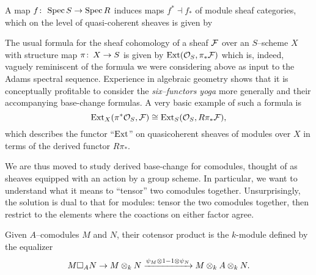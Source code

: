 \begin{definition}
A map $f\colon\thinspace \operatorname{Spec} S \to \operatorname{Spec} R$ induces maps $f^* \dashv f_*$ of module sheaf categories, which on the level of quasi-coherent sheaves is given by
\begin{center}
\end{center}
\end{definition}

The usual formula for the sheaf cohomology of a sheaf $\mathcal{F}$ over an $S$--scheme $X$ with structure map $\pi\colon\thinspace X \to S$ is given by $\operatorname{Ext}(\mathcal{O}_S, \pi_* \mathcal{F})$ which is, indeed, vaguely reminiscent of the formula we were considering above as input to the Adams spectral sequence.  Experience in algebraic geometry shows that it is conceptually profitable to consider the \emph{six--functors yoga} more generally and their accompanying base-change formulas.  A very basic example of such a formula is \[\operatorname{Ext}_X(\pi^* \mathcal{O}_S, \mathcal{F}) \cong \operatorname{Ext}_S(\mathcal{O}_S, R\pi_* \mathcal{F}),\] which describes the functor ``$\operatorname{Ext}$'' on quasicoherent sheaves of modules over $X$ in terms of the derived functor $R\pi_*$.

We are thus moved to study derived base-change for comodules, thought of as sheaves equipped with an action by a group scheme.  In particular, we want to understand what it means to ``tensor'' two comodules together.  Unsurprisingly, the solution is dual to that for modules: tensor the two comodules together, then restrict to the elements where the coactions on either factor agree.

\begin{definition}
Given $A$--comodules $M$ and $N$, their cotensor product is the $k$-module defined by the equalizer \[M \square_A N \to M \otimes_k N \xrightarrow{\psi_M \otimes 1 - 1 \otimes \psi_N} M \otimes_k A \otimes_k N.\]
\end{definition}

